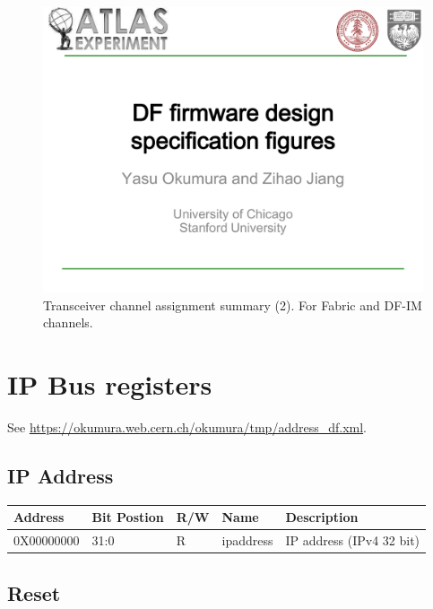 \documentclass[11pt,letterpaper]{article}
\begin{document}
\begin{figure}[h!]
  \centering
  \includegraphics[width=1.0\textwidth,clip,page=18]{figures.pdf}
  \caption{Transceiver channel assignment summary (2). For Fabric and DF-IM channels.}
  \label{fig:GTChannel2}
\end{figure}

\newpage
\clearpage 

\section {IP Bus registers}

See \url{https://okumura.web.cern.ch/okumura/tmp/address_df.xml}. 
\subsection {IP Address}

\begin{table}[h!]
\centering
\begin{tabular}{|l|l|l|l|l|}
\hline
Address  & Bit Postion & R/W & Name & Description \\ \hline
0X00000000           & 31:0        & R   & ipaddress & IP address (IPv4 32 bit)  \\ \hline
\end{tabular}
\end{table}

\subsection {Reset}
\end{document}
